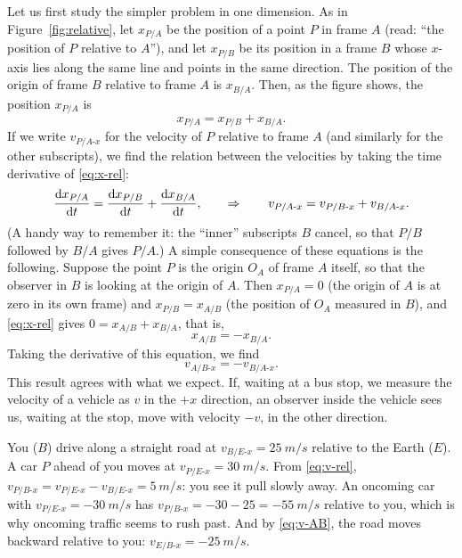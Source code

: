 \documentclass[11pt,a4paper]{article}
\newcommand{\relx}[2]{#1_{#2\text{-}x}}        %
\begin{document}
Let us first study the simpler problem in one dimension. As in Figure~\ref{fig:relative}, let
$x_{P/A}$ be the position of a point $P$ in frame $A$ (read: ``the position of $P$ relative to
$A$''), and let $x_{P/B}$ be its position in a frame $B$ whose $x$-axis lies along the same line and
points in the same direction. The position of the origin of frame $B$ relative to frame $A$ is
$x_{B/A}$. Then, as the figure shows, the position $x_{P/A}$ is
\begin{equation}\label{eq:x-rel}
  x_{P/A} = x_{P/B} + x_{B/A} .
\end{equation}
If we write $\relx{v}{P/A}$ for the velocity of $P$ relative to frame $A$ (and similarly for the
other subscripts), we find the relation between the velocities by taking the time derivative of
\eqref{eq:x-rel}:
\begin{equation}\label{eq:v-rel}
  \dv{x_{P/A}}{t} = \dv{x_{P/B}}{t} + \dv{x_{B/A}}{t} , \qquad \Rightarrow \qquad
  \relx{v}{P/A} = \relx{v}{P/B} + \relx{v}{B/A} .
\end{equation}
(A handy way to remember it: the ``inner'' subscripts $B$ cancel, so that $P/B$ followed by $B/A$
gives $P/A$.) A simple consequence of these equations is the following. Suppose the point $P$ is
the origin $O_A$ of frame $A$ itself, so that the observer in $B$ is looking at the origin of $A$.
Then $x_{P/A} = 0$ (the origin of $A$ is at zero in its own frame) and $x_{P/B} = x_{A/B}$ (the
position of $O_A$ measured in $B$), and \eqref{eq:x-rel} gives $0 = x_{A/B} + x_{B/A}$, that is,
\begin{equation}\label{eq:x-AB}
  x_{A/B} = -x_{B/A} .
\end{equation}
Taking the derivative of this equation, we find
\begin{equation}\label{eq:v-AB}
  \relx{v}{A/B} = -\relx{v}{B/A} .
\end{equation}
This result agrees with what we expect. If, waiting at a bus stop, we measure the velocity of a
vehicle as $v$ in the $+x$ direction, an observer inside the vehicle sees us, waiting at the stop,
move with velocity $-v$, in the other direction.

\begin{example}
You ($B$) drive along a straight road at $\relx{v}{B/E} = \qty{+25}{m/s}$ relative to the Earth
($E$). A car $P$ ahead of you moves at $\relx{v}{P/E} = \qty{+30}{m/s}$. From \eqref{eq:v-rel},
$\relx{v}{P/B} = \relx{v}{P/E} - \relx{v}{B/E} = \qty{+5}{m/s}$: you see it pull slowly away. An
oncoming car with $\relx{v}{P/E} = \qty{-30}{m/s}$ has $\relx{v}{P/B} = -30 - 25 = \qty{-55}{m/s}$
relative to you, which is why oncoming traffic seems to rush past. And by \eqref{eq:v-AB}, the road
moves backward relative to you: $\relx{v}{E/B} = \qty{-25}{m/s}$.
\end{example}
\end{document}
